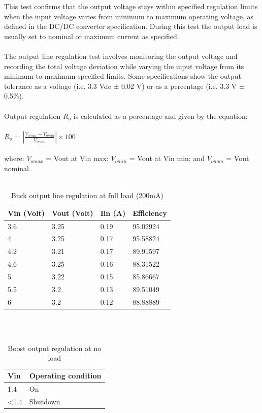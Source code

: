This test confirms that the output voltage stays within specified regulation limits when the input voltage varies from minimum to maximum operating voltage, as defined in the DC/DC converter specification. During this test the output load is usually set to nominal or maximum current as specified.
\\ \\
The output line regulation test involves monitoring the output voltage and recording the total voltage deviation while varying the input voltage from its minimum to maximum specified limits. Some specifications show the output tolerance as a voltage (i.e. 3.3 Vdc ± 0.02 V) or as a percentage (i.e. 3.3 V ± 0.5\%).
\\ \\
Output regulation $R_{o}$ is calculated as a percentage and given by the equation:
\\ \\
\hspace*{5cm}$R_{o}$ = $\left | \frac{V_{omax}-V_{omin}}{V_{onom}} \right | \times 100$
\\ \\
where:
$V_{omax}$ = Vout at Vin max; 
$V_{omin}$ = Vout at Vin min; and
$V_{onom}$ = Vout nominal.
\\ \\
\begin{table}[h]
\centering
\begin{tabular}{|l|l|l|l|}
\hline
Vin (Volt) & Vout (Volt) & Iin (A) & Efficiency \\ \hline
3.6        & 3.25        & 0.19    & 95.02924   \\ \hline
4          & 3.25        & 0.17    & 95.58824   \\ \hline
4.2        & 3.21        & 0.17    & 89.91597   \\ \hline
4.6        & 3.25        & 0.16    & 88.31522   \\ \hline
5          & 3.22        & 0.15    & 85.86667   \\ \hline
5.5        & 3.2         & 0.13    & 89.51049   \\ \hline
6          & 3.2         & 0.12    & 88.88889   \\ \hline
\end{tabular}
\caption{Buck output line regulation at full load (200mA)}
\label{table:4}
\end{table}
\\ \\
\begin{table}[h]
\centering
\begin{tabular}{|l|l|}
\hline
Vin            & Operating condition \\ \hline
1.4            & On                  \\ \hline
\textless{}1.4 & Shutdown            \\ \hline
\end{tabular}
\caption{Boost output regulation at no load}
\label{table:4}
\end{table}
